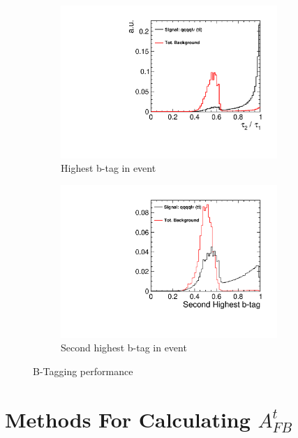 \begin{figure}
  \centering
  \begin{subfigure}{.5\textwidth}
    \centering
    \includegraphics[width=0.9\textwidth]{TopAnalysis/figures/HighestBTag.pdf}
    \caption[Highest b-tag in event]{Highest b-tag in event}
  \end{subfigure}%
  \begin{subfigure}{.5\textwidth}
    \centering
    \includegraphics[width=0.9\textwidth]{TopAnalysis/figures/NextHighestBTag.pdf}
    \caption[Second highest b-tag event in event]{Second highest b-tag in event}
  \end{subfigure}
  \caption[B-Tagging performance]{B-Tagging performance}
  \label{fig:btagging}
\end{figure}


\section{Methods For Calculating $A_{FB}^t$}
\label{Calculating AFB}

